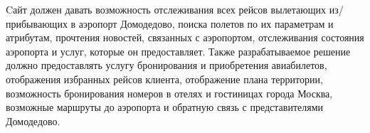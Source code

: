 Cайт должен давать возможность отслеживания 
всех рейсов вылетающих из/прибывающих в 
аэропорт Домодедово, поиска полетов по их 
параметрам и атрибутам, прочтения новостей, 
связанных с аэропортом, отслеживания состояния 
аэропорта и услуг, которые он предоставляет. 
Также разрабатываемое решение должно предоставлять 
услугу бронирования и приобретения авиабилетов, 
отображения избранных рейсов клиента, отображение плана территории, 
возможность бронирования номеров в отелях и гостиницах города Москва, 
возможные маршруты до аэропорта и обратную 
связь с представителями Домодедово. 